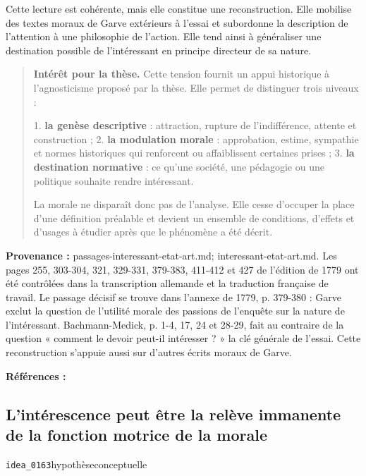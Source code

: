 \documentclass[10pt,a4paper]{article}
\begin{document}
Cette lecture est cohérente, mais elle constitue une reconstruction. Elle mobilise des textes moraux de Garve extérieurs à l'essai et subordonne la description de l'attention à une philosophie de l'action. Elle tend ainsi à généraliser une destination possible de l'intéressant en principe directeur de sa nature.

\begin{quote}
\textbf{Intérêt pour la thèse.} Cette tension fournit un appui historique à l'agnosticisme proposé par la thèse. Elle permet de distinguer trois niveaux :

1. \textbf{la genèse descriptive} : attraction, rupture de l'indifférence, attente et    construction ; 2. \textbf{la modulation morale} : approbation, estime, sympathie et normes historiques    qui renforcent ou affaiblissent certaines prises ; 3. \textbf{la destination normative} : ce qu'une société, une pédagogie ou une politique    souhaite rendre intéressant.

La morale ne disparaît donc pas de l'analyse. Elle cesse d'occuper la place d'une définition préalable et devient un ensemble de conditions, d'effets et d'usages à étudier après que le phénomène a été décrit.
\end{quote}
{\footnotesize\color{metadata}\textbf{Provenance :} passages-interessant-etat-art.md; interessant-etat-art.md. Les pages 255, 303-304, 321, 329-331, 379-383, 411-412 et 427 de l'édition de 1779 ont été contrôlées dans la transcription allemande et la traduction française de travail. Le passage décisif se trouve dans l'annexe de 1779, p. 379-380 : Garve exclut la question de l'utilité morale des passions de l'enquête sur la nature de l'intéressant. Bachmann-Medick, p. 1-4, 17, 24 et 28-29, fait au contraire de la question « comment le devoir peut-il intéresser ? » la clé générale de l'essai. Cette reconstruction s'appuie aussi sur d'autres écrits moraux de Garve.\par}
{\footnotesize\color{metadata}\textbf{Références :} \parencite{garve1779interessirende,bachmannmedick2008anziehungskraft}\par}

\subsection{L'intérescence peut être la relève immanente de la fonction motrice de la morale}
{\small\color{metadata} \texttt{idea\_0163}\quad\textbullet\quad hypothèse\quad\textbullet\quad conceptuelle\par}
\end{document}
